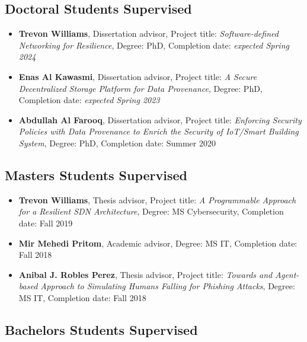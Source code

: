 
\hypertarget{phd-students}{%
\subsection{Doctoral Students Supervised}\label{phd-students}}

\begin{itemize}
\tightlist
\item \textbf{Trevon Williams}, Dissertation advisor, Project title: \textit{Software-defined Networking for Resilience}, Degree: PhD, Completion date: \textit{expected Spring 2024}
\item \textbf{Enas Al Kawasmi}, Dissertation advisor, Project title: \textit{A Secure Decentralized Storage Platform for Data Provenance}, Degree: PhD, Completion date: \textit{expected Spring 2023}
\item \textbf{Abdullah Al Farooq}, Dissertation advisor, Project title: \textit{Enforcing Security Policies with Data Provenance to Enrich the Security of IoT/Smart Building System}, Degree: PhD, Completion date: Summer 2020
\end{itemize}

\hypertarget{ms-students}{%
\subsection{Masters Students Supervised}\label{ms-students}}

\begin{itemize}
\tightlist
\item \textbf{Trevon Williams}, Thesis advisor, Project title: \textit{A Programmable Approach for a Resilient SDN Architecture}, Degree: MS Cybersecurity, Completion date: Fall 2019
\item \textbf{Mir Mehedi Pritom}, Academic advisor, Degree: MS IT, Completion date: Fall 2018
\item \textbf{Anibal J. Robles Perez}, Thesis advisor, Project title: \textit{Towards and Agent-based Approach to Simulating Humans Falling for Phishing Attacks}, Degree: MS IT, Completion date: Fall 2018
\end{itemize}

\hypertarget{bs-students}{%
\subsection{Bachelors Students Supervised}\label{bs-students}}

